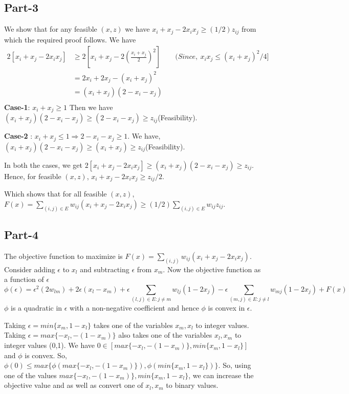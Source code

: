 \documentclass{article}
\begin{document}
\subsection{Part-3}
We show that for any feasible $(x,z)$ we have $x_i + x_j - 2x_ix_j \geq (1/2)z_{ij}$ from which the required proof follows. We have 
\begin{align*}
    2[x_i + x_j - 2x_ix_j] &\geq 2[x_i + x_j - 2\left(\frac{x_i+x_j}{2}\right)^2]\qquad (Since,\ x_ix_j \leq (x_i + x_j)^2/4]\\
    & = 2x_i + 2x_j - (x_i + x_j)^2 \\
    & = (x_i + x_j)(2 - x_i - x_j)\\
\end{align*}
\textbf{Case-1}: $x_i + x_j \geq 1$
Then we have $(x_i + x_j)(2 - x_i - x_j) \geq (2 - x_i - x_j) \geq z_{ij}$(Feasibility).

\noindent
\textbf{Case-2} : $x_i + x_j \leq 1 \Rightarrow 2 - x_i - x_j \geq 1$.
We have, $(x_i + x_j)(2 - x_i - x_j) \geq (x_i + x_j) \geq z_{ij}$(Feasibility).

In both the cases, we get $2[x_i + x_j - 2x_ix_j] \geq (x_i + x_j)(2 - x_i - x_j) \geq z_{ij}$. Hence, for feasible $(x,z)$, $x_i + x_j - 2x_ix_j \geq z_{ij}/2$.

Which shows that for all feasible $(x,z)$, $F(x) = \sum_{(i,j) \in E}w_{ij}(x_i + x_j - 2x_ix_j) \geq (1/2)\sum_{(i,j)\in E}w_{ij}z_{ij}$.

\subsection{Part-4}
The objective function to maximize is $F(x) = \sum_{(i,j)}w_{ij}(x_i + x_j - 2x_ix_j)$. Consider adding $\epsilon$ to $x_l$ and subtracting $\epsilon$ from $x_m$. Now the objective function as a function of $\epsilon$ 
\begin{equation*}
\phi(\epsilon) = \epsilon^2(2w_{lm}) + 2\epsilon(x_l - x_m) + \epsilon\sum_{(l,j) \in E: j \ne m}w_{lj}(1 - 2x_j) - \epsilon\sum_{(m,j)\in E : j \ne l}w_{mj}(1 - 2x_j) + F(x)
\end{equation*}
$\phi$ is a quadratic in $\epsilon$ with a non-negative coefficient and hence $\phi$ is convex in $\epsilon$.

Taking $\epsilon = min\{x_m, 1-x_l\}$ takes one of the variables $x_m, x_l$ to integer values. Taking $\epsilon = max\{-x_l, -(1 - x_m)\}$ also takes one of the variables $x_l, x_m$ to integer values (0,1). We have $0 \in [max\{-x_l, -(1 - x_m)\}, min\{x_m, 1 - x_l\}]$ and $\phi$ is convex. So, $\phi(0) \leq max\{\phi(max\{-x_l, -(1 - x_m)\}),\phi(min\{x_m, 1 - x_l\})\}$. So, using one of the values $max\{-x_l, -(1 - x_m)\},min\{x_m, 1 - x_l\}$, we can increase the objective value and as well as convert one of $x_l, x_m$ to binary values.
\end{document}
